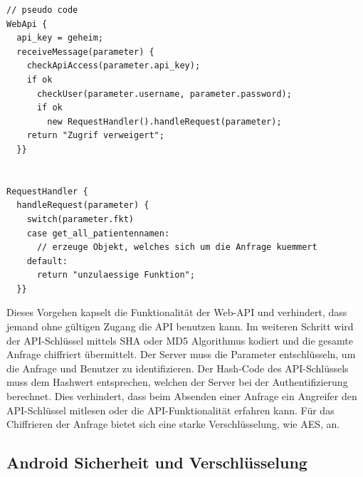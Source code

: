 \begin{lstlisting}[caption={Beispiel f\"ur Behandlung nach einem Aufruf der Web-API}]
// pseudo code
WebApi {
  api_key = geheim;
  receiveMessage(parameter) {  
    checkApiAccess(parameter.api_key);
    if ok 
      checkUser(parameter.username, parameter.password);
      if ok
        new RequestHandler().handleRequest(parameter);
    return "Zugrif verweigert";
  }}

  
RequestHandler {
  handleRequest(parameter) {  
    switch(parameter.fkt)
    case get_all_patientennamen:
      // erzeuge Objekt, welches sich um die Anfrage kuemmert      
    default:
      return "unzulaessige Funktion";
  }}
\end{lstlisting}

Dieses Vorgehen kapselt die Funktionalit\"at der Web-API und verhindert, dass jemand ohne g\"ultigen Zugang die API benutzen kann.
Im weiteren Schritt wird der API-Schl\"ussel mittels SHA oder MD5 Algorithmus kodiert und die gesamte Anfrage chiffriert \"ubermittelt.
Der Server muss die Parameter entschl\"usseln, um die Anfrage und Benutzer zu identifizieren.
Der Hash-Code des API-Schl\"ussels muss dem Hashwert entsprechen, welchen der Server bei der Authentifizierung berechnet.
Dies verhindert, dass beim Absenden einer Anfrage ein Angreifer den API-Schl\"ussel mitlesen oder die API-Funktionalit\"at erfahren kann.
F\"ur das Chiffrieren der Anfrage bietet sich eine starke Verschl\"usselung, wie AES, an.\\

\subsection{Android Sicherheit und Verschl\"usselung}
 
